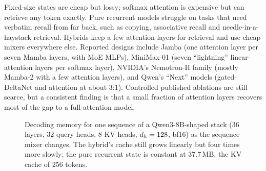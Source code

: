 Fixed-size states are cheap but lossy; softmax attention is expensive but can retrieve any token exactly.
Pure recurrent models struggle on tasks that need verbatim recall from far back, such as copying,
associative recall and needle-in-a-haystack retrieval. Hybrids keep a few attention layers for retrieval and
use cheap mixers everywhere else. Reported designs include Jamba (one attention layer per seven Mamba layers,
with MoE MLPs), MiniMax-01 (seven ``lightning'' linear-attention layers per softmax layer), NVIDIA's
Nemotron-H family (mostly Mamba-2 with a few attention layers), and Qwen's ``Next'' models (gated-DeltaNet
and attention at about 3:1). Controlled published ablations are still scarce, but a consistent finding is
that a small fraction of attention layers recovers most of the gap to a full-attention model.

\begin{figure}[t]
\centering
{}
\caption{Decoding memory for one sequence of a Qwen3-8B-shaped stack (36 layers, 32 query heads, 8 KV
heads, $d_{h}=128$, bf16) as the sequence mixer changes. The hybrid's cache still grows linearly but four
times more slowly; the pure recurrent state is constant at 37.7\,MB, the KV cache of 256 tokens.}
\label{fig:attnalt:cache}
\end{figure}

